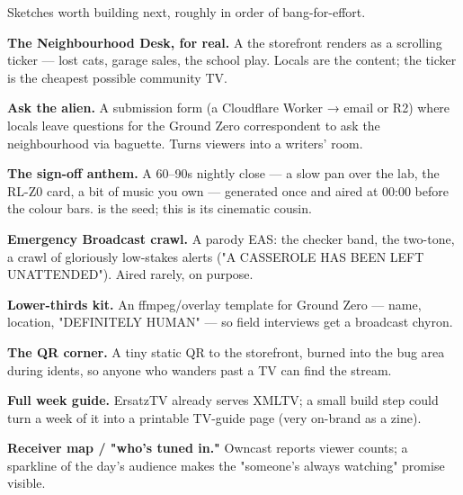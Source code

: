 \documentclass[fontpath=fonts/,logopath=logo/]{riposte-doc}
\begin{document}

Sketches worth building next, roughly in order of bang-for-effort.



\begin{ripbullets}
\item \textbf{The Neighbourhood Desk, for real.} A  the storefront renders as a scrolling ticker — lost cats, garage sales, the school play. Locals are the content; the ticker is the cheapest possible community TV.
\item \textbf{Ask the alien.} A submission form (a Cloudflare Worker → email or R2) where locals leave questions for the Ground Zero correspondent to ask the neighbourhood via baguette. Turns viewers into a writers' room.
\item \textbf{The sign-off anthem.} A 60–90s nightly close — a slow pan over the lab, the RL-Z0 card, a bit of music you own — generated once and aired at 00:00 before the colour bars.  is the seed; this is its cinematic cousin.
\item \textbf{Emergency Broadcast crawl.} A parody EAS: the checker band, the two-tone, a crawl of gloriously low-stakes alerts ("A CASSEROLE HAS BEEN LEFT UNATTENDED"). Aired rarely, on purpose.
\end{ripbullets}



\begin{ripbullets}
\item \textbf{Lower-thirds kit.} An ffmpeg/overlay template for Ground Zero — name, location, "DEFINITELY HUMAN" — so field interviews get a broadcast chyron.
\item \textbf{The QR corner.} A tiny static QR to the storefront, burned into the bug area during idents, so anyone who wanders past a TV can find the stream.
\end{ripbullets}



\begin{ripbullets}
\item \textbf{Full week guide.} ErsatzTV already serves XMLTV; a small build step could turn a week of it into a printable TV-guide page (very on-brand as a zine).
\item \textbf{Receiver map / "who's tuned in."} Owncast reports viewer counts; a sparkline of the day's audience makes the "someone's always watching" promise visible.
\end{ripbullets}
\end{document}
